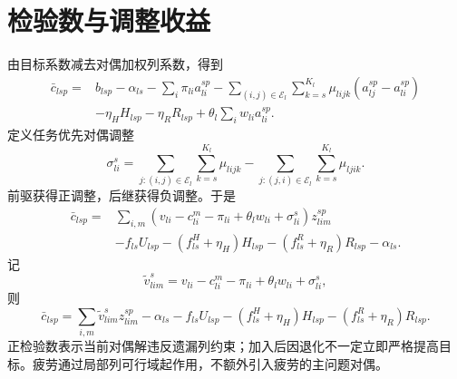 \documentclass[UTF8,a4paper,11pt]{ctexart}
\newcommand{\cg}[1]{\tag{CG-#1}}
\begin{document}
\section{检验数与调整收益}
由目标系数减去对偶加权列系数，得到
\begin{equation}
\begin{aligned}
\bar c_{lsp}={}&b_{lsp}-\alpha_{ls}-\sum_i\pi_{li}a_{li}^{sp}
-\sum_{(i,j)\in\mathcal E_l}\sum_{k=s}^{K_l}\mu_{lijk}(a_{lj}^{sp}-a_{li}^{sp})\\
&-\eta_HH_{lsp}-\eta_RR_{lsp}+\theta_l\sum_iw_{li}a_{li}^{sp}.
\end{aligned}\cg{30}
\end{equation}
定义任务优先对偶调整
\begin{equation}
\sigma_{li}^{s}=\sum_{j:(i,j)\in\mathcal E_l}\sum_{k=s}^{K_l}\mu_{lijk}
-\sum_{j:(j,i)\in\mathcal E_l}\sum_{k=s}^{K_l}\mu_{ljik}.\cg{31}
\end{equation}
前驱获得正调整，后继获得负调整。于是
\begin{equation}
\begin{aligned}
\bar c_{lsp}={}&\sum_{i,m}(v_{li}-c_{li}^m-\pi_{li}+\theta_lw_{li}+\sigma_{li}^{s})z_{lim}^{sp}\\
&-f_{ls}U_{lsp}-(f_{ls}^H+\eta_H)H_{lsp}-(f_{ls}^R+\eta_R)R_{lsp}-\alpha_{ls}.
\end{aligned}\cg{32}
\end{equation}
记
\begin{equation}\widetilde v_{lim}^{s}=v_{li}-c_{li}^m-\pi_{li}+\theta_lw_{li}+\sigma_{li}^{s},\cg{33}\end{equation}
则
\begin{equation}
\bar c_{lsp}=\sum_{i,m}\widetilde v_{lim}^{s}z_{lim}^{sp}-\alpha_{ls}
-f_{ls}U_{lsp}-(f_{ls}^H+\eta_H)H_{lsp}-(f_{ls}^R+\eta_R)R_{lsp}.\cg{34}
\end{equation}
正检验数表示当前对偶解违反遗漏列约束；加入后因退化不一定立即严格提高目标。疲劳通过局部列可行域起作用，不额外引入疲劳的主问题对偶。
\end{document}
